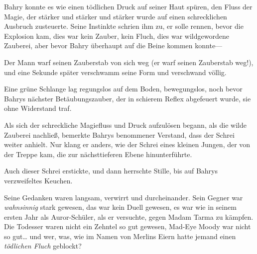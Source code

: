 Bahry konnte es wie einen tödlichen Druck auf seiner Haut spüren, den Fluss der Magie, der stärker und stärker und stärker wurde auf einen schrecklichen Ausbruch zusteuerte. Seine Instinkte schrien ihm zu, er solle rennen, bevor die Explosion kam, dies war kein Zauber, kein Fluch, dies war wildgewordene Zauberei, aber bevor Bahry überhaupt auf die Beine kommen konnte—

Der Mann warf seinen Zauberstab von sich weg (er warf seinen Zauberstab weg!), und eine Sekunde später verschwamm seine Form und verschwand völlig.

Eine grüne Schlange lag regungslos auf dem Boden, bewegungslos, noch bevor Bahrys nächster Betäubungszauber, der in schierem Reflex abgefeuert wurde, sie ohne Widerstand traf.

Als sich der schreckliche Magiefluss und Druck aufzulösen begann, als die wilde Zauberei nachließ, bemerkte Bahrys benommener Verstand, dass der Schrei weiter anhielt. Nur klang er anders, wie der Schrei eines kleinen Jungen, der von der Treppe kam, die zur nächsttieferen Ebene hinunterführte.

Auch dieser Schrei erstickte, und dann herrschte Stille, bis auf Bahrys verzweifeltes Keuchen.

Seine Gedanken waren langsam, verwirrt und durcheinander. Sein Gegner war \emph{wahnsinnig} stark gewesen, das war kein Duell gewesen, es war wie in seinem ersten Jahr als Auror-Schüler, als er versuchte, gegen Madam Tarma zu kämpfen. Die Todesser waren nicht ein Zehntel so gut gewesen, Mad-Eye Moody war nicht so gut… und wer, was, wie im Namen von Merlins Eiern hatte jemand einen \emph{tödlichen Fluch} geblockt?

